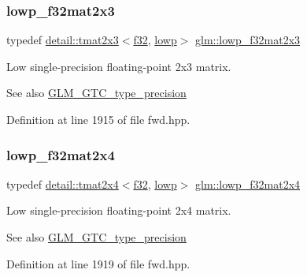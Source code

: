 \subsubsection{\texorpdfstring{lowp\+\_\+f32mat2x3}{lowp\_f32mat2x3}}
{\footnotesize\ttfamily typedef \hyperlink{structglm_1_1detail_1_1tmat2x3}{detail\+::tmat2x3}$<$\hyperlink{group__gtc__type__precision_ga0ec999b57f5330d9021256e96038df04}{f32}, \hyperlink{namespaceglm_a0f04f086094c747d227af4425893f545ae161af3fc695e696ce3bf69f7332bc2d}{lowp}$>$ \hyperlink{group__gtc__type__precision_ga7e45acb54ae2e4f5113a05b08eea5812}{glm\+::lowp\+\_\+f32mat2x3}}

Low single-\/precision floating-\/point 2x3 matrix. \begin{DoxySeeAlso}{See also}
\hyperlink{group__gtc__type__precision}{G\+L\+M\+\_\+\+G\+T\+C\+\_\+type\+\_\+precision} 
\end{DoxySeeAlso}


Definition at line 1915 of file fwd.\+hpp.

\mbox{\label{group__gtc__type__precision_gae0da8e4239df703d44875b49a900c893}} 
\subsubsection{\texorpdfstring{lowp\+\_\+f32mat2x4}{lowp\_f32mat2x4}}
{\footnotesize\ttfamily typedef \hyperlink{structglm_1_1detail_1_1tmat2x4}{detail\+::tmat2x4}$<$\hyperlink{group__gtc__type__precision_ga0ec999b57f5330d9021256e96038df04}{f32}, \hyperlink{namespaceglm_a0f04f086094c747d227af4425893f545ae161af3fc695e696ce3bf69f7332bc2d}{lowp}$>$ \hyperlink{group__gtc__type__precision_gae0da8e4239df703d44875b49a900c893}{glm\+::lowp\+\_\+f32mat2x4}}

Low single-\/precision floating-\/point 2x4 matrix. \begin{DoxySeeAlso}{See also}
\hyperlink{group__gtc__type__precision}{G\+L\+M\+\_\+\+G\+T\+C\+\_\+type\+\_\+precision} 
\end{DoxySeeAlso}


Definition at line 1919 of file fwd.\+hpp.

\mbox{\label{group__gtc__type__precision_ga84500ab23c0f0f3c585f8ad02f33b88c}} 
